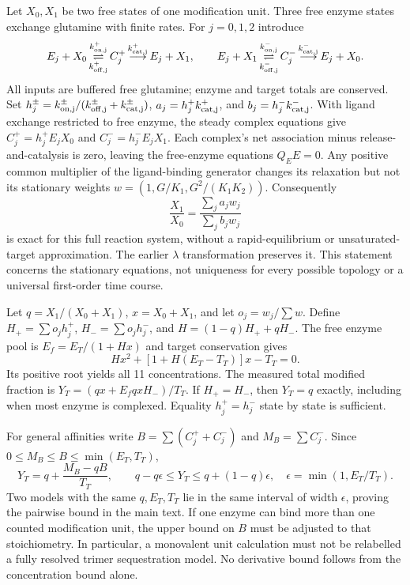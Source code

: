 \documentclass[11pt]{article}
\begin{document}
Let $X_0,X_1$ be two free states of one modification unit. Three free enzyme states exchange glutamine with finite rates. For $j=0,1,2$ introduce
\[
 E_j+X_0\mathop{\rightleftharpoons}^{k_{\rm on,j}^+}_{k_{\rm off,j}^+} C_j^+
 \mathop{\longrightarrow}^{k_{\rm cat,j}^+} E_j+X_1,
\qquad
 E_j+X_1\mathop{\rightleftharpoons}^{k_{\rm on,j}^-}_{k_{\rm off,j}^-} C_j^-
 \mathop{\longrightarrow}^{k_{\rm cat,j}^-} E_j+X_0.
\]
All inputs are buffered free glutamine; enzyme and target totals are conserved. Set $h_j^\pm=k_{\rm on,j}^\pm/(k_{\rm off,j}^\pm+k_{\rm cat,j}^\pm)$, $a_j=h_j^+k_{\rm cat,j}^+$, and $b_j=h_j^-k_{\rm cat,j}^-$. With ligand exchange restricted to free enzyme, the steady complex equations give $C_j^+=h_j^+E_jX_0$ and $C_j^-=h_j^-E_jX_1$. Each complex's net association minus release-and-catalysis is zero, leaving the free-enzyme equations $Q_EE=0$. Any positive common multiplier of the ligand-binding generator changes its relaxation but not its stationary weights $w=(1,G/K_1,G^2/(K_1K_2))$. Consequently
\[
 \frac{X_1}{X_0}=\frac{\sum_j a_jw_j}{\sum_j b_jw_j}
\]
is exact for this full reaction system, without a rapid-equilibrium or unsaturated-target approximation. The earlier $\lambda$ transformation preserves it. This statement concerns the stationary equations, not uniqueness for every possible topology or a universal first-order time course.

Let $q=X_1/(X_0+X_1)$, $x=X_0+X_1$, and let $o_j=w_j/\sum w$. Define $H_+=\sum o_jh_j^+$, $H_-=\sum o_jh_j^-$, and $H=(1-q)H_++qH_-$. The free enzyme pool is $E_f=E_T/(1+Hx)$ and target conservation gives
\[
 Hx^2+[1+H(E_T-T_T)]x-T_T=0.
\]
Its positive root yields all 11 concentrations. The measured total modified fraction is $Y_T=(qx+E_fqxH_-)/T_T$. If $H_+=H_-$, then $Y_T=q$ exactly, including when most enzyme is complexed. Equality $h_j^+=h_j^-$ state by state is sufficient.

For general affinities write $B=\sum(C_j^++C_j^-)$ and $M_B=\sum C_j^-$. Since $0\leq M_B\leq B\leq\min(E_T,T_T)$,
\[
Y_T=q+\frac{M_B-qB}{T_T},\qquad
q-q\epsilon\leq Y_T\leq q+(1-q)\epsilon,
\quad \epsilon=\min(1,E_T/T_T).
\]
Two models with the same $q,E_T,T_T$ lie in the same interval of width $\epsilon$, proving the pairwise bound in the main text. If one enzyme can bind more than one counted modification unit, the upper bound on $B$ must be adjusted to that stoichiometry. In particular, a monovalent unit calculation must not be relabelled a fully resolved trimer sequestration model. No derivative bound follows from the concentration bound alone.
\end{document}
